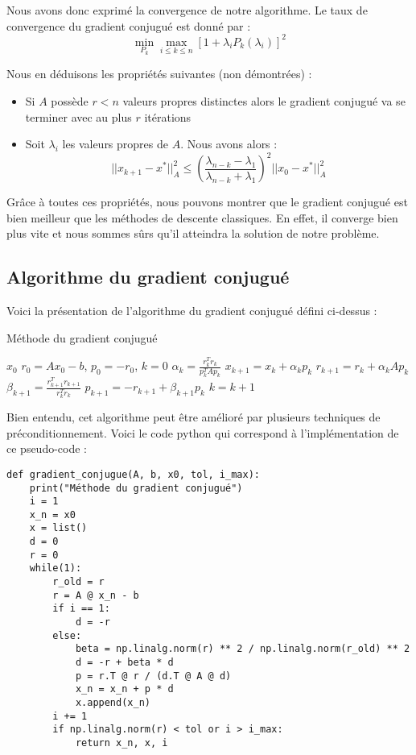 Nous avons donc exprimé la convergence de notre algorithme. Le taux de convergence du gradient conjugué est donné par : 
\begin{equation}
\min_{P_k}\underset{i \leq k \leq n}{\max}\left[1 + \lambda_iP_k(\lambda_i)\right]^2
\end{equation}

Nous en déduisons les propriétés suivantes (non démontrées) : 
\begin{itemize}
	\item Si $A$ possède $r < n$ valeurs propres distinctes alors le gradient conjugué va se terminer avec au plus $r$ itérations
	\item Soit $\lambda_i$ les valeurs propres de $A$. Nous avons alors : 
	\begin{equation}
	||x_{k+1} - x^*||^2_A \leq \left( \frac{\lambda_{n - k} - \lambda_1}{\lambda_{n - k} + \lambda_1} \right)^2 ||x_0 - x^*||^2_A
	\end{equation}
\end{itemize}

Grâce à toutes ces propriétés, nous pouvons montrer que le gradient conjugué est bien meilleur que les méthodes de descente classiques. En effet, il converge bien plus vite et nous sommes sûrs qu'il atteindra la solution de notre problème.
\subsection{Algorithme du gradient conjugué}
Voici la présentation de l'algorithme du gradient conjugué défini ci-dessus : 
\begin{algorithm}[H]
	\caption{Méthode du gradient conjugué}
	\begin{algorithmic}[1]
		\Require $x_0$
		\State $r_0 = Ax_0 - b$, $p_0 = -r_0$, $k = 0$
		\State $\alpha_k = \frac{r_k^Tr_k}{p_k^TAp_k}$
		\State $x_{k+1} = x_k + \alpha_k p_k$
		\State $r_{k+1} = r_k + \alpha_k A p_k$
		\State $\beta_{k+1} = \frac{r_{k+1}^Tr_{k+1}}{r_{k}^Tr_{k}} $
		\State $p_{k+1} = -r_{k+1} + \beta_{k+1}p_k$
		\State $k = k+1$
		\EndWhile
	\end{algorithmic}
\end{algorithm}

Bien entendu, cet algorithme peut être amélioré par plusieurs techniques de préconditionnement. Voici le code python qui correspond à l'implémentation de ce pseudo-code : 

\begin{verbatim}
def gradient_conjugue(A, b, x0, tol, i_max):
	print("Méthode du gradient conjugué")
	i = 1
	x_n = x0
	x = list()
	d = 0
	r = 0
	while(1):
		r_old = r
		r = A @ x_n - b
		if i == 1:
			d = -r
		else:
			beta = np.linalg.norm(r) ** 2 / np.linalg.norm(r_old) ** 2
			d = -r + beta * d
			p = r.T @ r / (d.T @ A @ d)
			x_n = x_n + p * d
			x.append(x_n)
		i += 1
		if np.linalg.norm(r) < tol or i > i_max:
			return x_n, x, i
\end{verbatim}

